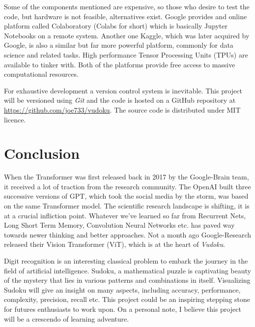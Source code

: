 \documentclass[12pt, a4paper]{report}
\begin{document}
Some of the components mentioned are expensive, so those who desire to test the code, but hardware is not feasible, alternatives exist. Google provides and online platform called Colaboratory (Colabs for short) which is basically Jupyter Notebooks on a remote system. Another one Kaggle, which was later acquired by Google, is also a similar but far more powerful platform, commonly for data science and related tasks. High performance Tensor Processing Units (TPUs) are available to tinker with. Both of the platforms provide free access to massive computational resources.

For exhaustive development a version control system is inevitable. This project will be versioned using \emph{Git} and the code is hosted on a GitHub repository at \url{https://github.com/joe733/vudoku}. The source code is distributed under MIT licence.
\vspace*{\fill}

\chapter{Conclusion}
\label{chap:conclusion}
\thispagestyle{fancy}
\hspace{0.5cm} When the Transformer was first released back in 2017 by the Google-Brain team, it received a lot of traction from the research community. The OpenAI built three successive versions of GPT, which took the social media by the storm, was based on the same Transformer model. The scientific research landscape is shifting, it is at a crucial infliction point. Whatever we've learned so far from Recurrent Nets, Long Short Term Memory, Convolution Neural Networks etc. has paved way towards newer thinking and better approaches. Not a month ago Google-Research released their Vision Transformer (ViT), which is at the heart of \emph{Vudoku}.

Digit recognition is an interesting classical problem to embark the journey in the field of artificial intelligence. Sudoku, a mathematical puzzle is captivating beauty of the mystery that lies in various patterns and combinations in itself. Visualizing Sudoku will give an insight on many aspects, including accuracy, performance, complexity, precision, recall etc. This project could be an inspiring stepping stone for futures enthusiasts to work upon. On a personal note, I believe this project will be a crescendo of learning adventure.
\vspace*{\fill}



\thispagestyle{fancy}
\end{document}
